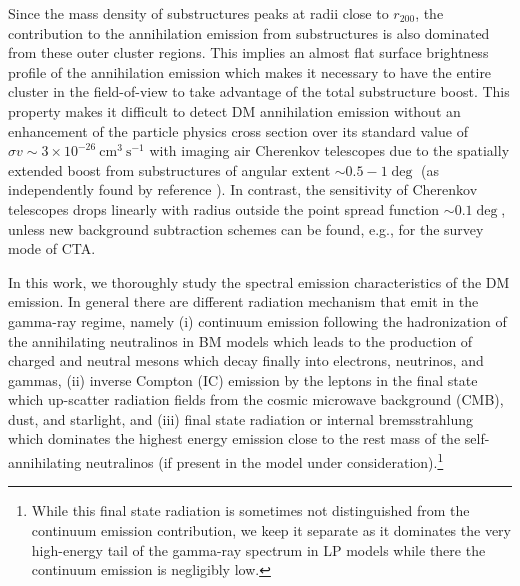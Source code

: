 \documentclass[10pt,aps,pra,reprint,amsmath,amsfonts,amssymb,showpacs,nofootinbib,floatfix]{revtex4-1}
\newcommand{\rvir}{r_{200}}
\begin{document}
Since the mass density of substructures peaks at radii close to
$\rvir$, the contribution to the annihilation emission from
substructures is also dominated from these outer cluster regions.
This implies an almost flat surface brightness profile of the
annihilation emission which makes it necessary to have the entire
cluster in the field-of-view to take advantage of the total
substructure boost. This property makes it difficult to detect DM
annihilation emission without an enhancement of the particle physics
cross section over its standard value of $\sigma v\sim 3\times
10^{-26} ~\mathrm{cm}^3~\mathrm{s}^{-1}$ with imaging air Cherenkov
telescopes due to the spatially extended boost from substructures of
angular extent $\sim 0.5-1\deg$ (as independently found by reference
\cite{2011arXiv1104.3530S}). In contrast, the sensitivity of Cherenkov
telescopes drops linearly with radius outside the point spread
function $\sim 0.1\deg$, unless new background subtraction schemes can
be found, e.g., for the survey mode of CTA.

In this work, we thoroughly study the spectral emission
characteristics of the DM emission. In general there are different
radiation mechanism that emit in the gamma-ray regime, namely (i)
continuum emission following the hadronization of the annihilating
neutralinos in BM models which leads to the production of charged and
neutral mesons which decay finally into electrons, neutrinos, and
gammas, (ii) inverse Compton (IC) emission by the leptons in the final
state which up-scatter radiation fields from the cosmic microwave
background (CMB), dust, and starlight, and (iii) final state radiation
or internal bremsstrahlung which dominates the highest energy emission
close to the rest mass of the self-annihilating neutralinos (if
present in the model under consideration).\footnote{While this final
  state radiation is sometimes not distinguished from the continuum
  emission contribution, we keep it separate as it dominates the very
  high-energy tail of the gamma-ray spectrum in LP models while there
  the continuum emission is negligibly low.}
\end{document}
